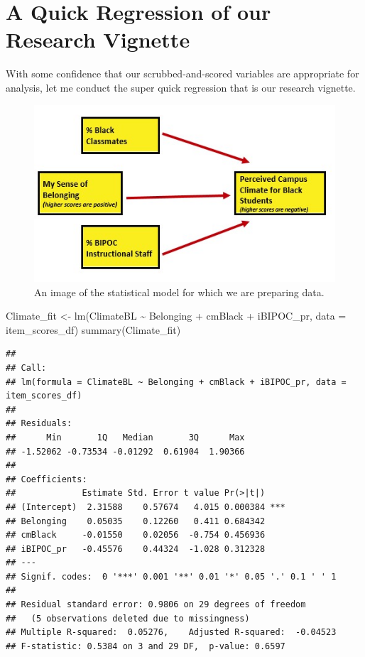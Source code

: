 \documentclass[
  english,
]{book}
\newenvironment{Shaded}{\begin{snugshade}}{\end{snugshade}}
\newcommand{\AttributeTok}[1]{\textcolor[rgb]{0.77,0.63,0.00}{#1}}
\newcommand{\FunctionTok}[1]{\textcolor[rgb]{0.00,0.00,0.00}{#1}}
\newcommand{\NormalTok}[1]{#1}
\newcommand{\OtherTok}[1]{\textcolor[rgb]{0.56,0.35,0.01}{#1}}
\newcommand{\SpecialCharTok}[1]{\textcolor[rgb]{0.00,0.00,0.00}{#1}}
\begin{document}
\hypertarget{a-quick-regression-of-our-research-vignette}{%
\section{A Quick Regression of our Research Vignette}\label{a-quick-regression-of-our-research-vignette}}

With some confidence that our scrubbed-and-scored variables are appropriate for analysis, let me conduct the super quick regression that is our research vignette.

\begin{figure}
\centering
\includegraphics{images/Ch04/BlStuRegression.jpg}
\caption{An image of the statistical model for which we are preparing data.}
\end{figure}

\begin{Shaded}
\begin{Highlighting}[]
\NormalTok{Climate\_fit }\OtherTok{\textless{}{-}} \FunctionTok{lm}\NormalTok{(ClimateBL }\SpecialCharTok{\textasciitilde{}}\NormalTok{ Belonging }\SpecialCharTok{+}\NormalTok{ cmBlack }\SpecialCharTok{+}\NormalTok{ iBIPOC\_pr, }\AttributeTok{data =}\NormalTok{ item\_scores\_df)}
\FunctionTok{summary}\NormalTok{(Climate\_fit)}
\end{Highlighting}
\end{Shaded}

\begin{verbatim}
## 
## Call:
## lm(formula = ClimateBL ~ Belonging + cmBlack + iBIPOC_pr, data = item_scores_df)
## 
## Residuals:
##      Min       1Q   Median       3Q      Max 
## -1.52062 -0.73534 -0.01292  0.61904  1.90366 
## 
## Coefficients:
##             Estimate Std. Error t value Pr(>|t|)    
## (Intercept)  2.31588    0.57674   4.015 0.000384 ***
## Belonging    0.05035    0.12260   0.411 0.684342    
## cmBlack     -0.01550    0.02056  -0.754 0.456936    
## iBIPOC_pr   -0.45576    0.44324  -1.028 0.312328    
## ---
## Signif. codes:  0 '***' 0.001 '**' 0.01 '*' 0.05 '.' 0.1 ' ' 1
## 
## Residual standard error: 0.9806 on 29 degrees of freedom
##   (5 observations deleted due to missingness)
## Multiple R-squared:  0.05276,    Adjusted R-squared:  -0.04523 
## F-statistic: 0.5384 on 3 and 29 DF,  p-value: 0.6597
\end{verbatim}
\end{document}
